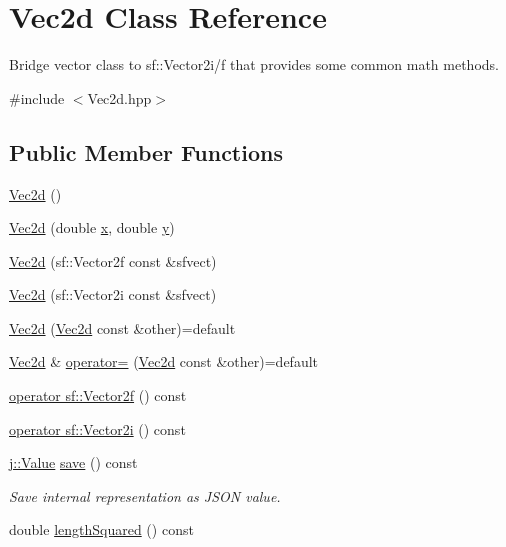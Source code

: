 \hypertarget{class_vec2d}{\section{Vec2d Class Reference}
\label{class_vec2d}
}


Bridge vector class to sf\-::\-Vector2i/f that provides some common math methods.  




{\ttfamily \#include $<$Vec2d.\-hpp$>$}

\subsection*{Public Member Functions}
\begin{DoxyCompactItemize}
\item 
\hyperlink{class_vec2d_ac2ccb8d4cae336ddf93a40ef0a726d13}{Vec2d} ()
\item 
\hyperlink{class_vec2d_ab6778e114160eeef760206ed0c822fa3}{Vec2d} (double \hyperlink{class_vec2d_a2f2289c32bb0ae9c85facaf6b4643fa8}{x}, double \hyperlink{class_vec2d_aa314dea89fb8f30bc110f184d0a2813c}{y})
\item 
\hyperlink{class_vec2d_af6d4beb974c29f3df6a78b7646b0d88d}{Vec2d} (sf\-::\-Vector2f const \&sfvect)
\item 
\hyperlink{class_vec2d_aa8b909bce6c256a2851f666b84393cd2}{Vec2d} (sf\-::\-Vector2i const \&sfvect)
\item 
\hyperlink{class_vec2d_accc0256ab924d033517f03f649cef724}{Vec2d} (\hyperlink{class_vec2d}{Vec2d} const \&other)=default
\item 
\hyperlink{class_vec2d}{Vec2d} \& \hyperlink{class_vec2d_a597eb2348b9a057718efb5a0d19840ae}{operator=} (\hyperlink{class_vec2d}{Vec2d} const \&other)=default
\item 
\hyperlink{class_vec2d_ae30def482f4ec4e68710266520ec4511}{operator sf\-::\-Vector2f} () const 
\item 
\hyperlink{class_vec2d_ac88fe28d5ea17c096ed2756ca7491d22}{operator sf\-::\-Vector2i} () const 
\item 
\hyperlink{classj_1_1_value}{j\-::\-Value} \hyperlink{class_vec2d_af10f2e02b6e9d6b21af6634fc2ae6651}{save} () const 
\begin{DoxyCompactList}\small\item\em Save internal representation as J\-S\-O\-N value. \end{DoxyCompactList}\item 
double \hyperlink{class_vec2d_a878176ba8e1bb581b8bf6a81f5ea7803}{length\-Squared} () const 

\end{DoxyCompactItemize}
